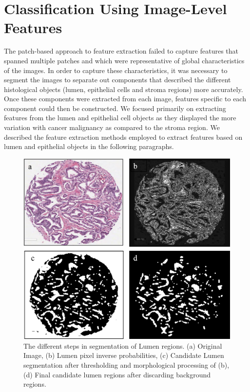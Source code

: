 \section{Classification Using Image-Level Features}
The patch-based approach to feature extraction failed to capture features that spanned multiple patches and which were representative of global characteristics of the images. 
In order to capture these characteristics, it was necessary to segment the images to separate out components that described the different histological objects (lumen, epithelial cells and stroma regions) more accurately. Once these components were extracted from each image, features specific to each component could then be constructed. We focused primarily on extracting features from the lumen and epithelial cell objects as they displayed the more variation with cancer malignancy as compared to the stroma region. We described the feature extraction methods employed to extract features based on lumen and epithelial objects in the following paragraphs.

\begin{figure}[!htb]
\centering
\includegraphics[scale=0.3]{figs/lumen_processing.png}
\caption{The different steps in segmentation of Lumen regions. (a) Original Image, (b) Lumen pixel inverse probabilities, (c) Candidate Lumen segmentation after thresholding and morphological processing of (b), (d) Final candidate lumen regions after discarding background regions.}
\label{fig:lumen_extraction_process}
\centering
\end{figure}



